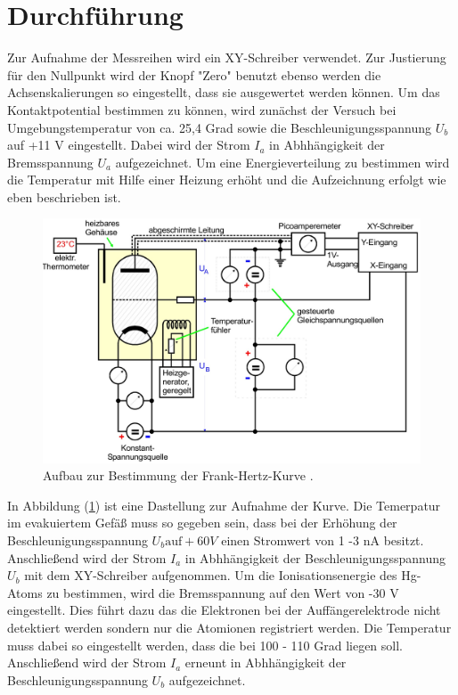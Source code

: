 \section{Durchführung}
Zur Aufnahme der Messreihen wird ein XY-Schreiber
verwendet. Zur Justierung für den Nullpunkt wird der
Knopf "Zero" benutzt ebenso werden die Achsenskalierungen
so eingestellt, dass sie ausgewertet werden können.
Um das Kontaktpotential bestimmen zu können, wird zunächst der
Versuch bei Umgebungstemperatur von ca. 25,4 Grad sowie die Beschleunigungsspannung $U_b$
auf +11 V eingestellt. Dabei wird der Strom $I_a$ in Abhhängigkeit der Bremsspannung $U_a$ aufgezeichnet.
Um eine Energieverteilung zu bestimmen wird die Temperatur mit Hilfe einer Heizung erhöht und die Aufzeichnung
erfolgt wie eben beschrieben ist.
\begin{figure}
  \centering
  \includegraphics[width = 7 cm , height = 5.5 cm]{content/Anleitung.jpg}
  \caption{Aufbau zur Bestimmung der Frank-Hertz-Kurve \cite{1}.}
  \label{abb:3}
\end{figure}
In Abbildung (\ref{abb:3}) ist eine Dastellung zur Aufnahme der Kurve. Die Temerpatur im evakuiertem Gefäß muss so gegeben sein,
dass bei der Erhöhung der Beschleunigungsspannung $U_b \text{auf} + 60 V$ einen Stromwert von 1 -3 nA besitzt.
Anschließend wird der Strom $I_a$ in Abhhängigkeit der Beschleunigungsspannung $U_b$ mit dem XY-Schreiber aufgenommen.
Um die Ionisationsenergie des Hg-Atoms zu bestimmen, wird die Bremsspannung auf den Wert von -30 V eingestellt.
Dies führt dazu das die Elektronen bei der Auffängerelektrode nicht detektiert werden sondern nur die Atomionen registriert werden.
Die Temperatur muss dabei so eingestellt werden, dass die bei 100 - 110 Grad liegen soll.
Anschließend wird der Strom $I_a$ erneunt in Abhhängigkeit der Beschleunigungsspannung $U_b$ aufgezeichnet.
